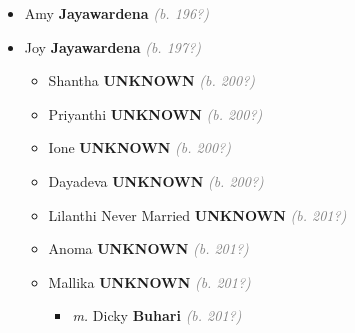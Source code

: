 \documentclass[10pt, openany]{book}
\begin{document}
\begin{itemize}
{\begin{itemize}
{\begin{itemize}
{\begin{itemize}
{\begin{itemize}
{\begin{itemize}
\item{Dr P C Prasanna Chandrakantha  Obstetrics \textbf{Gunesekera} \textcolor{gray}{\textit{(b. 199?)}}
\begin{itemize}
\item{\textit{m.} Dr Dulani Siriwardene Paediatrics Professor Sri Jayewardenepura \textbf{University} \textcolor{gray}{\textit{(b. 200?)}}   \label{couple:00003322:00003323} \begin{itemize}
\item{Kanchana Vejayanth \textbf{Gunesekera} \textcolor{gray}{\textit{(b. 202?)}} \textcolor{slmaroon}{\textit{BSc Mech Eng.}}
  }
\end{itemize}}
\end{itemize}
      }
\end{itemize}}
\end{itemize}
 }
\item{Amy \textbf{Jayawardena} \textcolor{gray}{\textit{(b. 196?)}}
 }
\item{Joy \textbf{Jayawardena} \textcolor{gray}{\textit{(b. 197?)}}
\begin{itemize}
\item{Shantha \textbf{UNKNOWN} \textcolor{gray}{\textit{(b. 200?)}}
 }
\item{Priyanthi \textbf{UNKNOWN} \textcolor{gray}{\textit{(b. 200?)}}
 }
\item{Ione \textbf{UNKNOWN} \textcolor{gray}{\textit{(b. 200?)}}
 }
\item{Dayadeva \textbf{UNKNOWN} \textcolor{gray}{\textit{(b. 200?)}}
 }
\item{Lilanthi Never Married \textbf{UNKNOWN} \textcolor{gray}{\textit{(b. 201?)}}
   }
\item{Anoma \textbf{UNKNOWN} \textcolor{gray}{\textit{(b. 201?)}}
 }
\item{Mallika \textbf{UNKNOWN} \textcolor{gray}{\textit{(b. 201?)}}
\begin{itemize}
\item{\textit{m.} Dicky \textbf{Buhari} \textcolor{gray}{\textit{(b. 201?)}}   \label{couple:00003289:00003290} \begin{itemize}

\end{itemize}}
\end{itemize}}
\end{itemize}}
\end{itemize}}
\end{itemize}}
\end{itemize}}
\end{itemize}
\end{document}
